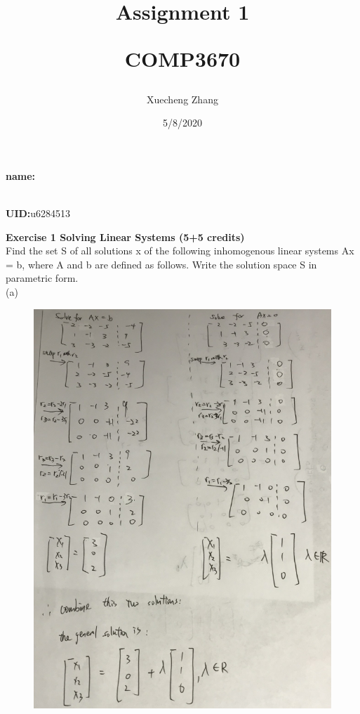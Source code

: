 \documentclass{article}
\title{Assignment  1\\ \vspace{0.2cm}

		COMP3670
}
\begin{document}
\setlength\parindent{0pt}
\maketitle
\vspace*{\fill}
    \begin{center}
    
        \textbf{name:}\author{Xuecheng Zhang}
        \\
        \textbf{UID:}u6284513
        
        \vspace{1.8cm}
        
        \date{5/8/2020}
    
    \end{center}
\vspace*{\fill}

\newpage

\textbf{Exercise 1 Solving Linear Systems (5+5 credits)}\\
Find the set S of all solutions x of the following inhomogenous linear systems Ax = b, where A and b are defined as follows. Write the solution space S in parametric form.\\

(a)
\begin{figure}[H]
  \includegraphics[width = \linewidth] {1a.JPG}
\end{figure}
\end{document}
